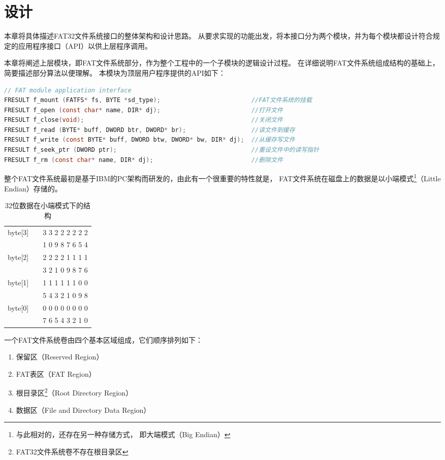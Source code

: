 
\chapter{设计}
\label{chap:Design}
本章将具体描述FAT32文件系统接口的整体架构和设计思路。
从要求实现的功能出发，将本接口分为两个模块，并为每个模块都设计符合规定的应用程序接口（API）以供上层程序调用。

本章将阐述上层模块，即FAT文件系统部分，作为整个工程中的一个子模块的逻辑设计过程。
在详细说明FAT文件系统组成结构的基础上，简要描述部分算法以便理解。
本模块为顶层用户程序提供的API如下：
\begin{lstlisting}[language={C}, caption={上层模块的API}]
// FAT module application interface
FRESULT f_mount (FATFS* fs, BYTE *sd_type);                         //FAT文件系统的挂载
FRESULT f_open (const char* name, DIR* dj);                         //打开文件
FRESULT f_close(void);                                              //关闭文件
FRESULT f_read (BYTE* buff, DWORD btr, DWORD* br);                  //读文件到缓存
FRESULT f_write (const BYTE* buff, DWORD btw, DWORD* bw, DIR* dj);  //从缓存写文件
FRESULT f_seek_ptr (DWORD ptr);                                     //重设文件中的读写指针
FRESULT f_rm (const char* name, DIR* dj);                           //删除文件
\end{lstlisting}
整个FAT文件系统最初是基于IBM的PC架构而研发的，由此有一个很重要的特性就是，
FAT文件系统在磁盘上的数据是以小端模式\footnote{与此相对的，还存在另一种存储方式，
即大端模式（Big Endian）}（Little Endian）存储的。
\begin{table}[!htb]
  \centering
  \caption[小端模式存储示例]{32位数据在小端模式下的结构}\label{tab:littleendian}
  \begin{tabular}{lcr} \toprule
      byte[3] & &3 3 2 2 2 2 2 2 \\
              & &1 0 9 8 7 6 5 4 \\
      byte[2] & &2 2 2 2 1 1 1 1 \\
              & &3 2 1 0 9 8 7 6 \\
      byte[1] & &1 1 1 1 1 1 0 0 \\
              & &5 4 3 2 1 0 9 8 \\
      byte[0] & &0 0 0 0 0 0 0 0 \\
              & &7 6 5 4 3 2 1 0 \\ \bottomrule
  \end{tabular}
\end{table}
一个FAT文件系统卷由四个基本区域组成，它们顺序排列如下：
\begin{enumerate}[noitemsep,topsep=0pt,parsep=0pt,partopsep=0pt,leftmargin=6cm]
    \item[0) ––] 保留区（Reserved Region）
    \item[1) ––] FAT表区（FAT Region）
    \item[2) ––] 根目录区\footnote{FAT32文件系统卷不存在根目录区}（Root Directory Region）
    \item[3) ––] 数据区（File and Directory Data Region）
\end{enumerate}
